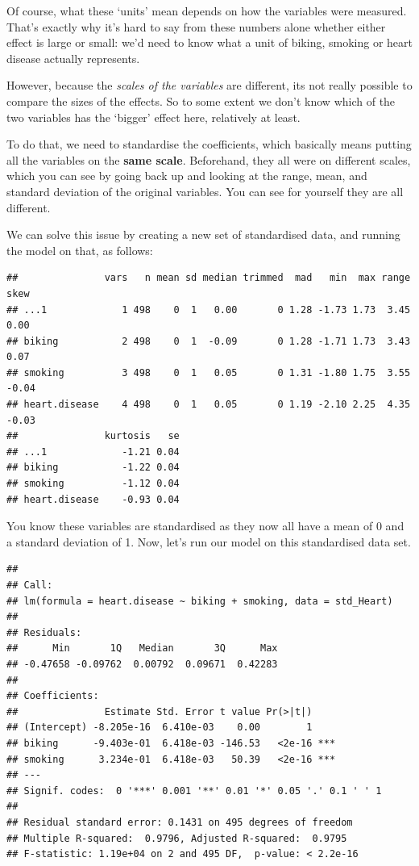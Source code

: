 \documentclass[
]{book}
\begin{document}
Of course, what these `units' mean depends on how the variables were measured. That's exactly why it's hard to say from these numbers alone whether either effect is large or small: we'd need to know what a unit of biking, smoking or heart disease actually represents.

However, because the \emph{scales of the variables} are different, its not really possible to compare the sizes of the effects. So to some extent we don't know which of the two variables has the `bigger' effect here, relatively at least.

To do that, we need to standardise the coefficients, which basically means putting all the variables on the \textbf{same scale}. Beforehand, they all were on different scales, which you can see by going back up and looking at the range, mean, and standard deviation of the original variables. You can see for yourself they are all different.

We can solve this issue by creating a new set of standardised data, and running the model on that, as follows:

\begin{verbatim}
##               vars   n mean sd median trimmed  mad   min  max range  skew
## ...1             1 498    0  1   0.00       0 1.28 -1.73 1.73  3.45  0.00
## biking           2 498    0  1  -0.09       0 1.28 -1.71 1.73  3.43  0.07
## smoking          3 498    0  1   0.05       0 1.31 -1.80 1.75  3.55 -0.04
## heart.disease    4 498    0  1   0.05       0 1.19 -2.10 2.25  4.35 -0.03
##               kurtosis   se
## ...1             -1.21 0.04
## biking           -1.22 0.04
## smoking          -1.12 0.04
## heart.disease    -0.93 0.04
\end{verbatim}

You know these variables are standardised as they now all have a mean of 0 and a standard deviation of 1. Now, let's run our model on this standardised data set.

\begin{verbatim}
## 
## Call:
## lm(formula = heart.disease ~ biking + smoking, data = std_Heart)
## 
## Residuals:
##      Min       1Q   Median       3Q      Max 
## -0.47658 -0.09762  0.00792  0.09671  0.42283 
## 
## Coefficients:
##               Estimate Std. Error t value Pr(>|t|)    
## (Intercept) -8.205e-16  6.410e-03    0.00        1    
## biking      -9.403e-01  6.418e-03 -146.53   <2e-16 ***
## smoking      3.234e-01  6.418e-03   50.39   <2e-16 ***
## ---
## Signif. codes:  0 '***' 0.001 '**' 0.01 '*' 0.05 '.' 0.1 ' ' 1
## 
## Residual standard error: 0.1431 on 495 degrees of freedom
## Multiple R-squared:  0.9796, Adjusted R-squared:  0.9795 
## F-statistic: 1.19e+04 on 2 and 495 DF,  p-value: < 2.2e-16
\end{verbatim}
\end{document}
